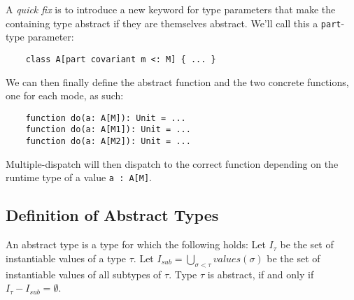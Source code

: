 A \textit{quick fix} is to introduce a new keyword for type parameters that make the containing type abstract if they are themselves abstract. We'll call this a \texttt{part}-type parameter:

\begin{lstlisting}
    class A[part covariant m <: M] { ... }
\end{lstlisting}

We can then finally define the abstract function and the two concrete functions, one for each mode, as such:

\begin{lstlisting}
    function do(a: A[M]): Unit = ...
    function do(a: A[M1]): Unit = ...
    function do(a: A[M2]): Unit = ...
\end{lstlisting}

Multiple-dispatch will then dispatch to the correct function depending on the runtime type of a value \texttt{a : A[M]}.


\subsection{Definition of Abstract Types}
An abstract type is a type for which the following holds: Let $I_\tau$ be the set of instantiable values of a type $\tau$. Let $I_{sub} = \bigcup_{\sigma < \tau} values(\sigma)$ be the set of instantiable values of all subtypes of $\tau$. Type $\tau$ is abstract, if and only if $I_\tau - I_{sub} = \emptyset$.






